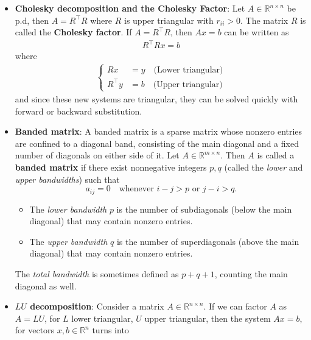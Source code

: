 \documentclass{report}
\begin{document}
\begin{itemize}
        \item \textbf{Cholesky decomposition and the Cholesky Factor}: Let $A \in \mathbb{R}^{n\times n}$ be p.d, then $A = R^{\top}R$ where $R$ is upper triangular with $r_{ii} > 0$. The matrix $R$ is called the \textbf{Cholesky factor}.
            \bigbreak \noindent 
            If $A = R^{\top}R$, then $Ax = b$ can be written as 
            \begin{align*}
                R^{\top}Rx = b
            \end{align*}
            where
            \begin{align*}
                \begin{cases}
                        Rx &= y \quad \text{(Lower triangular)}              \\
                        R^{\top}y &= b \quad \text{(Upper triangular)}
                \end{cases}
            \end{align*}
            and since these new systems are triangular, they can be solved quickly with forward or backward substitution.
        \item \textbf{Banded matrix}: A banded matrix is a sparse matrix whose nonzero entries are confined to a diagonal band, consisting of the main diagonal and a fixed number of diagonals on either side of it.
            \bigbreak \noindent 
                Let $A \in \mathbb{R}^{m \times n}$.  
                Then $A$ is called a \textbf{banded matrix} if there exist nonnegative integers $p, q$ (called the \emph{lower} and \emph{upper bandwidths}) such that
                \[
                    a_{ij} = 0 \quad \text{whenever } i - j > p \text{ or } j - i > q.
                \]
                \begin{itemize}
                    \item The \emph{lower bandwidth} $p$ is the number of subdiagonals (below the main diagonal) that may contain nonzero entries.
                    \item The \emph{upper bandwidth} $q$ is the number of superdiagonals (above the main diagonal) that may contain nonzero entries.
                \end{itemize}
                The \emph{total bandwidth} is sometimes defined as $p + q + 1$, counting the main diagonal as well.
        \item \textbf{$LU$ decomposition}: Consider a matrix $A \in \mathbb{R}^{n\times n} $. If we can factor $A$ as $A = LU$, for $L$ lower triangular, $U$ upper triangular, then the system $Ax = b$, for vectors $x,b \in \mathbb{R}^{n}$ turns into

\end{itemize}
\end{document}
